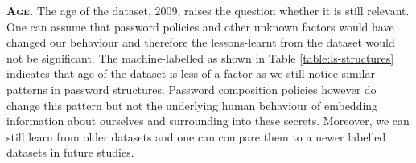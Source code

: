 \textbf{\textsc{Age.}}\: The age of the \hmail dataset, 2009, raises the question whether it is still relevant. One can assume that password policies and other unknown factors would have changed our behaviour and therefore the lessons-learnt from the \hmail dataset would not be significant. The machine-labelled \lizardsquad as shown in Table \ref{table:ls-structures} indicates that age of the dataset is less of a factor as we still notice similar patterns in password structures. Password composition policies however do change this pattern but not the underlying human behaviour of embedding information about ourselves and surrounding into these secrets. Moreover, we can still learn from older datasets and one can compare them to a newer labelled datasets in future studies.

